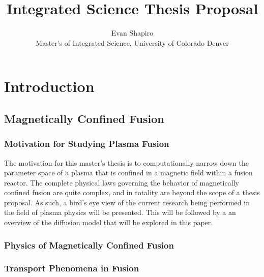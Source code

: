 \documentclass{article}
\title{Integrated Science Thesis Proposal}
\author{Evan Shapiro \\ Master's of Integrated Science, University of Colorado Denver}
\begin{document}
\maketitle
\tableofcontents
\section{Introduction}
\subsection{Magnetically Confined Fusion}
\subsubsection{Motivation for Studying Plasma Fusion}
The motivation for this master's thesis is to computationally narrow down the parameter space of a plasma that is confined in a magnetic field within a fusion reactor.
The complete physical laws governing the behavior of magnetically confined fusion are quite complex, and in totality are beyond the scope of a thesis proposal. 
As such, a bird's eye view of the current research being performed in the field of plasma physics will be presented. 
This will be followed by a an overview of the diffusion model that will be explored in this paper.\\
\subsubsection{Physics of Magnetically Confined Fusion}
\subsubsection{Transport Phenomena in Fusion}
\
\end{document}
